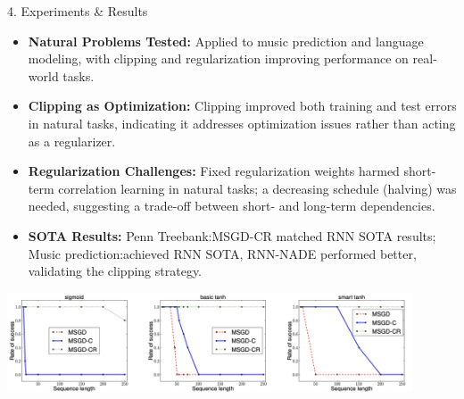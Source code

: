 \documentclass[final]{beamer}
\begin{document}
\begin{frame}[t]
\begin{columns}[t,totalwidth=\textwidth]
\begin{column}{0.3\textwidth}
\begin{block}{4. Experiments \& Results}
\begin{itemize}
    \item \justifying \textbf{Natural Problems Tested:} Applied to music prediction and language modeling, with clipping and regularization improving performance on real-world tasks.
    
    \item \justifying \textbf{Clipping as Optimization:} Clipping improved both training and test errors in natural tasks, indicating it addresses optimization issues rather than acting as a regularizer.  

    \item \justifying \textbf{Regularization Challenges:} Fixed regularization weights harmed short-term correlation learning in natural tasks; a decreasing schedule (halving) was needed, suggesting a trade-off between short- and long-term dependencies.  

    \item \justifying \textbf{SOTA Results:} Penn Treebank:MSGD-CR matched RNN SOTA results; Music prediction:achieved RNN SOTA, RNN-NADE performed better, validating the clipping strategy. 

  \end{itemize} %
\begin{center}
  \includegraphics[width=0.9\textwidth]{figures/results.png}
\end{center}




\end{block}
\end{column}
\end{columns}
\end{frame}
\end{document}
